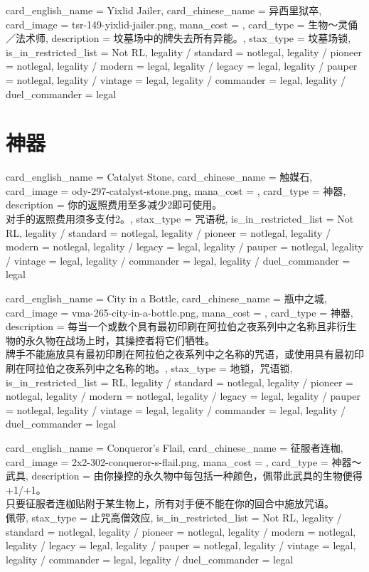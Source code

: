 \documentclass[lang = cn, color = black, 10pt]{AllThatStax}
\begin{document}
\card
{
	card_english_name = {Yixlid Jailer},
	card_chinese_name = {异西里狱卒},
	card_image = tsr-149-yixlid-jailer.png,
	mana_cost = ,
	card_type = 生物～灵俑／法术师,
	description = {坟墓场中的牌失去所有异能。},
	stax_type = 坟墓场锁,
	is_in_restricted_list = Not RL,
	legality / standard = notlegal,
	legality / pioneer = notlegal,
	legality / modern = legal,
	legality / legacy = legal,
	legality / pauper = notlegal,
	legality / vintage = legal,
	legality / commander = legal,
	legality / duel_commander = legal
}

\section{神器}

\card
{
	card_english_name = {Catalyst Stone},
	card_chinese_name = {触媒石},
	card_image = ody-297-catalyst-stone.png,
	mana_cost = ,
	card_type = 神器,
	description = {你的返照费用至多减少2即可使用。\\
对手的返照费用须多支付2。},
	stax_type = 咒语税,
	is_in_restricted_list = Not RL,
	legality / standard = notlegal,
	legality / pioneer = notlegal,
	legality / modern = notlegal,
	legality / legacy = legal,
	legality / pauper = notlegal,
	legality / vintage = legal,
	legality / commander = legal,
	legality / duel_commander = legal
}

\card
{
	card_english_name = {City in a Bottle},
	card_chinese_name = {瓶中之城},
	card_image = vma-265-city-in-a-bottle.png,
	mana_cost = ,
	card_type = 神器,
	description = {每当一个或数个具有最初印刷在阿拉伯之夜系列中之名称且非衍生物的永久物在战场上时，其操控者将它们牺牲。\\
牌手不能施放具有最初印刷在阿拉伯之夜系列中之名称的咒语，或使用具有最初印刷在阿拉伯之夜系列中之名称的地。},
	stax_type = 地锁，咒语锁,
	is_in_restricted_list = RL,
	legality / standard = notlegal,
	legality / pioneer = notlegal,
	legality / modern = notlegal,
	legality / legacy = legal,
	legality / pauper = notlegal,
	legality / vintage = legal,
	legality / commander = legal,
	legality / duel_commander = legal
}

\card
{
	card_english_name = {Conqueror's Flail},
	card_chinese_name = {征服者连枷},
	card_image = 2x2-302-conqueror-s-flail.png,
	mana_cost = ,
	card_type = 神器～武具,
	description = {由你操控的永久物中每包括一种颜色，佩带此武具的生物便得+1/+1。\\
只要征服者连枷贴附于某生物上，所有对手便不能在你的回合中施放咒语。\\
佩带},
	stax_type = 止咒高僧效应,
	is_in_restricted_list = Not RL,
	legality / standard = notlegal,
	legality / pioneer = notlegal,
	legality / modern = notlegal,
	legality / legacy = legal,
	legality / pauper = notlegal,
	legality / vintage = legal,
	legality / commander = legal,
	legality / duel_commander = legal
}
\end{document}
